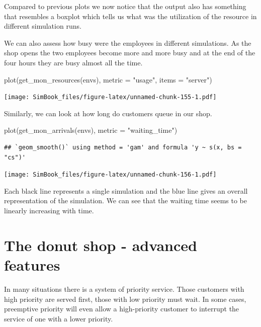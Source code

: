 \documentclass[
]{book}
\newenvironment{Shaded}{\begin{snugshade}}{\end{snugshade}}
\newcommand{\AttributeTok}[1]{\textcolor[rgb]{0.77,0.63,0.00}{#1}}
\newcommand{\FunctionTok}[1]{\textcolor[rgb]{0.00,0.00,0.00}{#1}}
\newcommand{\NormalTok}[1]{#1}
\newcommand{\StringTok}[1]{\textcolor[rgb]{0.31,0.60,0.02}{#1}}
\begin{document}
Compared to previous plots we now notice that the output also has something that resembles a boxplot which tells us what was the utilization of the resource in different simulation runs.

We can also assess how busy were the employees in different simulations. As the shop opens the two employees become more and more busy and at the end of the four hours they are busy almost all the time.

\begin{Shaded}
\begin{Highlighting}[]
\FunctionTok{plot}\NormalTok{(}\FunctionTok{get\_mon\_resources}\NormalTok{(envs), }\AttributeTok{metric =} \StringTok{"usage"}\NormalTok{, }\AttributeTok{items =} \StringTok{"server"}\NormalTok{)}
\end{Highlighting}
\end{Shaded}

\texttt{[image: SimBook\_files/figure-latex/unnamed-chunk-155-1.pdf]}

Similarly, we can look at how long do customers queue in our shop.

\begin{Shaded}
\begin{Highlighting}[]
\FunctionTok{plot}\NormalTok{(}\FunctionTok{get\_mon\_arrivals}\NormalTok{(envs), }\AttributeTok{metric =} \StringTok{"waiting\_time"}\NormalTok{)}
\end{Highlighting}
\end{Shaded}

\begin{verbatim}
## `geom_smooth()` using method = 'gam' and formula 'y ~ s(x, bs = "cs")'
\end{verbatim}

\texttt{[image: SimBook\_files/figure-latex/unnamed-chunk-156-1.pdf]}

Each black line represents a single simulation and the blue line gives an overall representation of the simulation. We can see that the waiting time seems to be linearly increasing with time.

\hypertarget{the-donut-shop---advanced-features}{%
\section{The donut shop - advanced features}\label{the-donut-shop---advanced-features}}

In many situations there is a system of priority service. Those customers with high priority are served first, those with low priority must wait. In some cases, preemptive priority will even allow a high-priority customer to interrupt the service of one with a lower priority.
\end{document}
